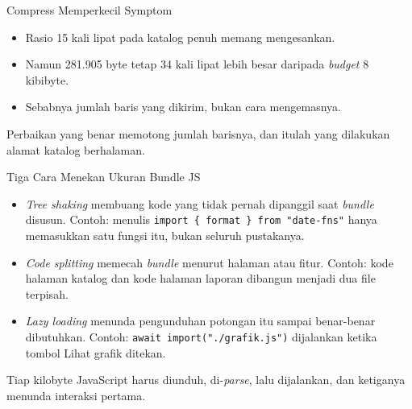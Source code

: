 \documentclass[aspectratio=169, table, 12pt]{beamer}
\begin{document}
\begin{frame}{{\Large Compress Memperkecil Symptom}}
  \vspace{14pt}
  \begin{itemize}
    \item Rasio 15 kali lipat pada katalog penuh memang mengesankan.
    \item Namun 281.905 byte tetap 34 kali lipat lebih besar daripada
          \textit{budget} 8 kibibyte.
    \item Sebabnya jumlah baris yang dikirim, bukan cara mengemasnya.
  \end{itemize}
  \vspace{10pt}
  {\footnotesize Perbaikan yang benar memotong jumlah barisnya, dan itulah
  yang dilakukan alamat katalog berhalaman.}
\end{frame}

\begin{frame}{{\Large Tiga Cara Menekan Ukuran Bundle JS}}
  \vspace{14pt}
  \begin{itemize}
    \item \textit{Tree shaking} membuang kode yang tidak pernah dipanggil saat
          \textit{bundle} disusun. Contoh: menulis
          \texttt{import \{ format \} from "date-fns"} hanya memasukkan satu
          fungsi itu, bukan seluruh pustakanya.
    \item \textit{Code splitting} memecah \textit{bundle} menurut halaman atau
          fitur. Contoh: kode halaman katalog dan kode halaman laporan
          dibangun menjadi dua file terpisah.
    \item \textit{Lazy loading} menunda pengunduhan potongan itu sampai
          benar-benar dibutuhkan. Contoh:
          \texttt{await import("./grafik.js")} dijalankan ketika tombol
          Lihat grafik ditekan.
  \end{itemize}
  \vspace{6pt}
  {\footnotesize Tiap kilobyte JavaScript harus diunduh, di-\textit{parse},
  lalu dijalankan, dan ketiganya menunda interaksi pertama.}
\end{frame}
\end{document}
